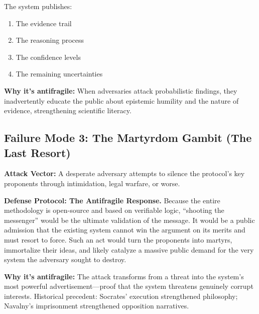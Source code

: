 \documentclass[11pt,a4paper]{article}
\begin{document}
The system publishes:
\begin{enumerate}[nosep]
    \item The evidence trail
    \item The reasoning process
    \item The confidence levels
    \item The remaining uncertainties
\end{enumerate}

\textbf{Why it's antifragile:} When adversaries attack probabilistic findings, they inadvertently educate the public about epistemic humility and the nature of evidence, strengthening scientific literacy.

\subsection{Failure Mode 3: The Martyrdom Gambit (The Last Resort)}
\textbf{Attack Vector:} A desperate adversary attempts to silence the protocol's key proponents through intimidation, legal warfare, or worse.

\textbf{Defense Protocol: The Antifragile Response.} Because the entire methodology is open-source and based on verifiable logic, ``shooting the messenger'' would be the ultimate validation of the message. It would be a public admission that the existing system cannot win the argument on its merits and must resort to force. Such an act would turn the proponents into martyrs, immortalize their ideas, and likely catalyze a massive public demand for the very system the adversary sought to destroy.

\textbf{Why it's antifragile:} The attack transforms from a threat into the system's most powerful advertisement—proof that the system threatens genuinely corrupt interests. Historical precedent: Socrates' execution strengthened philosophy; Navalny's imprisonment strengthened opposition narratives.
\end{document}
